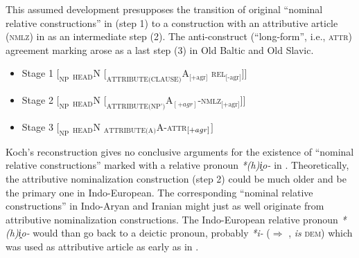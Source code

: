 This assumed development presupposes the transition of original “nominal relative constructions” in  (step 1) to a construction with an attributive article (\textsc{nmlz}) in  as an intermediate step (2). The anti\hyp{}construct (“long-form”, i.e., \textsc{attr}) agreement marking arose as a last step (3) in Old Baltic and Old Slavic.
\begin{itemize}
\item Stage 1 $[_{\text{NP}}$ $_{\text{HEAD}}$N $[_{\text{ATTRIBUTE(CLAUSE)}}$A$_{\text{[+{agr}]}}$ \textsc{rel}$_{\text{[-{agr}]}}$$] ]$
\item Stage 2 $[_{\text{NP}}$ $_{\text{HEAD}}$N $[_{\text{ATTRIBUTE(NP')}}$A$_{[+{agr}]}$-\textsc{nmlz}$_{\text{[+{agr}]}}$$] ]$ \label{koch constit nomzr}
\item Stage 3 $[_{\text{NP}}$ $_{\text{HEAD}}$N $_{\text{ATTRIBUTE(A)}}$A-\textsc{attr}$_{\text[+{agr}]}$$]$
\end{itemize}
Koch's reconstruction gives no conclusive arguments for the existence of “nominal relative constructions” marked with a relative pronoun \textit{*(h)i̭o-} in . Theoretically, the attributive nominalization construction (step 2) could be much older and be the primary one in Indo-European. The corresponding “nominal relative constructions” in Indo-Aryan and Iranian might just as well originate from attributive nominalization constructions. The Indo-European relative pronoun \textit{*(h)i̭o-} would than go back to a deictic pronoun, probably \textit{*i-} ($\Rightarrow$ ,  \textit{is} \textsc{dem}) which was used as attributive article as early as in .


